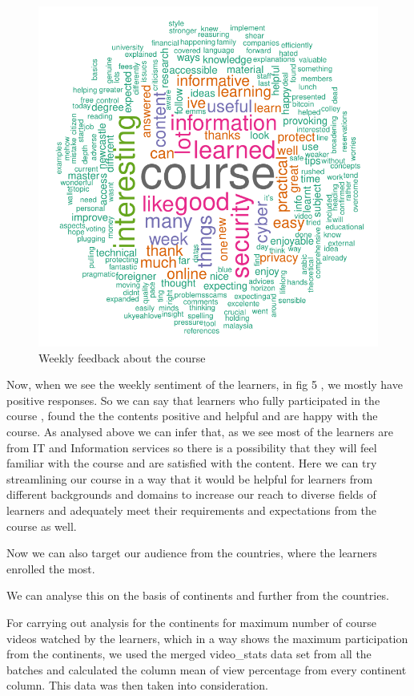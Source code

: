 \documentclass[
]{article}
\begin{document}
\begin{figure}
\includegraphics[width=1\linewidth]{CSC8631-Reports_files/figure-latex/unnamed-chunk-5-1} \caption{Weekly feedback about the course}\label{fig:unnamed-chunk-5}
\end{figure}

Now, when we see the weekly sentiment of the learners, in fig 5 , we
mostly have positive responses. So we can say that learners who fully
participated in the course , found the the contents positive and helpful
and are happy with the course. As analysed above we can infer that, as
we see most of the learners are from IT and Information services so
there is a possibility that they will feel familiar with the course and
are satisfied with the content. Here we can try streamlining our course
in a way that it would be helpful for learners from different
backgrounds and domains to increase our reach to diverse fields of
learners and adequately meet their requirements and expectations from
the course as well.

Now we can also target our audience from the countries, where the
learners enrolled the most.

We can analyse this on the basis of continents and further from the
countries.

For carrying out analysis for the continents for maximum number of
course videos watched by the learners, which in a way shows the maximum
participation from the continents, we used the merged video\_stats data
set from all the batches and calculated the column mean of view
percentage from every continent column. This data was then taken into
consideration.
\end{document}
